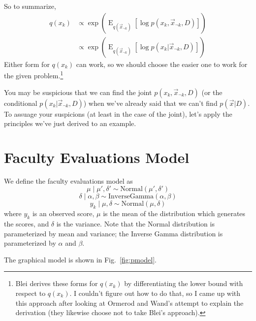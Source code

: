 \documentclass[12pt]{article}
\newcommand{\E}{\operatorname{E}}
\begin{document}
So to summarize,
\begin{align}\label{eq:qform}
    q(x_k) &\propto
    \exp (\E_{q(\vec{x}_{\neg k})}[\log p(x_k, \vec{x}_{\neg k},D)])
    \nonumber \\
    &\propto
    \exp (\E_{q(\vec{x}_{\neg k})}[\log p(x_k|\vec{x}_{\neg k},D)])
\end{align}
Either form for $q(x_k)$ can work, so we should choose the easier one to work
for the given problem.\footnote{Blei \autocite{bleinotesvar} derives these forms
for $q(x_k)$ by differentiating the lower bound with respect to $q(x_k)$.  I
couldn't figure out how to do that, so I came up with this approach after
looking at Ormerod and Wand's attempt to explain the derivation
\autocite{ormerod2010explaining} (they likewise choose not to take Blei's
approach).}

You may be suspicious that we can find the joint $p(x_k, \vec{x}_{\neg k}, D)$
(or the conditional $p(x_k|\vec{x}_{\neg k}, D)$) when we've already said that
we can't find $p(\vec{x}|D)$.  To assuage your suspicions (at least in the case
of the joint), let's apply the principles we've just derived to an example.

\section{Faculty Evaluations Model}

We define the faculty evaluations model as
\begin{equation}
    \mu \mid \mu', \delta' \sim \text{Normal}(\mu', \delta')
\end{equation}
\begin{equation}
    \delta \mid \alpha, \beta \sim \text{InverseGamma}(\alpha, \beta)
\end{equation}
\begin{equation}
    y_{k} \mid \mu, \delta \sim \text{Normal}(\mu, \delta)
\end{equation}
where $y_{k}$ is an observed score, $\mu$ is the mean of the distribution which
generates the scores, and $\delta$ is the variance.  Note that the Normal
distribution is parameterized by mean and variance; the Inverse Gamma
distribution is parameterized by $\alpha$ and $\beta$.

The graphical model is shown in Fig.~\ref{fig:pmodel}.
\end{document}

